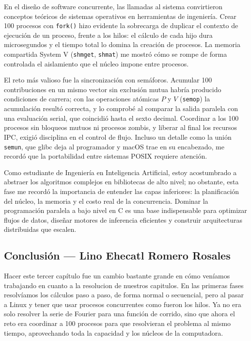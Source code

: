 En el diseño de software concurrente, las llamadas al sistema convirtieron conceptos teóricos de sistemas operativos en herramientas de ingeniería. Crear 100 procesos con \texttt{fork()} hizo evidente la sobrecarga de duplicar el contexto de ejecución de un proceso, frente a los hilos: el cálculo de cada hijo dura microsegundos y el tiempo total lo domina la creación de procesos. La memoria compartida System V (\texttt{shmget}, \texttt{shmat}) me mostró cómo se rompe de forma controlada el aislamiento que el núcleo impone entre procesos.

El reto más valioso fue la sincronización con semáforos. Acumular 100 contribuciones en un mismo vector sin exclusión mutua habría producido condiciones de carrera; con las operaciones atómicas $P$ y $V$ (\texttt{semop}) la acumulación resultó correcta, y lo comprobé al comparar la salida paralela con una evaluación serial, que coincidió hasta el sexto decimal. Coordinar a los 100 procesos sin bloqueos mutuos ni procesos zombis, y liberar al final los recursos IPC, exigió disciplina en el control de flujo. Incluso un detalle como la unión \texttt{semun}, que glibc deja al programador y macOS trae en su encabezado, me recordó que la portabilidad entre sistemas POSIX requiere atención.

Como estudiante de Ingeniería en Inteligencia Artificial, estoy acostumbrado a abstraer los algoritmos complejos en bibliotecas de alto nivel; no obstante, esta fase me recordó la importancia de entender las capas inferiores: la planificación del núcleo, la memoria y el costo real de la concurrencia. Dominar la programación paralela a bajo nivel en C es una base indispensable para optimizar flujos de datos, diseñar motores de inferencia eficientes y construir arquitecturas distribuidas que escalen.
\clearpage
\subsection{Conclusión — Lino Ehecatl Romero Rosales}
\label{sec:cap03:concl:lino}

Hacer este tercer capítulo fue un cambio bastante grande en cómo veníamos trabajando en cuanto a la resolucion de nuestros capitulos. En las primeras fases resolvíamos los cálculos paso a paso, de forma normal o secuencial, pero al pasar a Linux y tener que usar procesos concurrentes como fueron los hilos. Ya no era solo resolver la serie de Fourier para una función de corrido, sino que ahora el reto era coordinar a 100 procesos para que resolvieran el problema al mismo tiempo, aprovechando toda la capacidad y los núcleos de la computadora.

